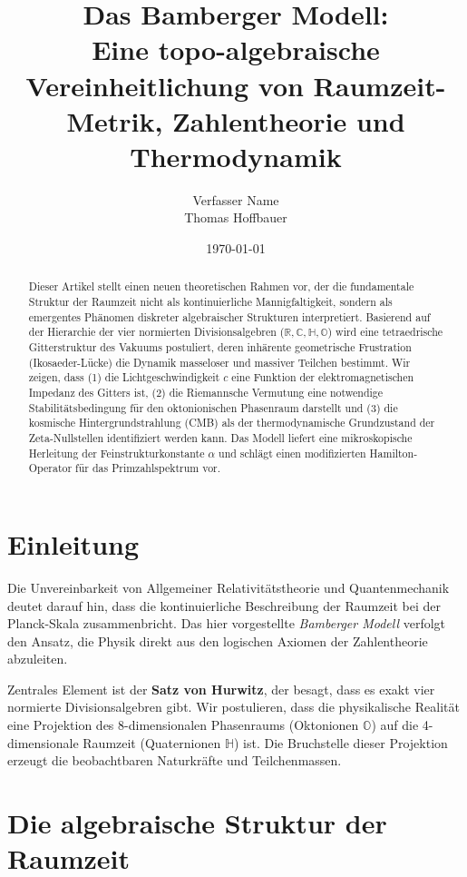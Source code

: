 \documentclass[11pt, a4paper]{article}
\title{\textbf{Das Bamberger Modell:}\\ \large Eine topo-algebraische Vereinheitlichung von Raumzeit-Metrik, Zahlentheorie und Thermodynamik}
\author{Verfasser Name \\ \small{Thomas Hoffbauer}}
\date{\today}
\begin{document}
	
	\maketitle
	
	\begin{abstract}
		\noindent
		Dieser Artikel stellt einen neuen theoretischen Rahmen vor, der die fundamentale Struktur der Raumzeit nicht als kontinuierliche Mannigfaltigkeit, sondern als emergentes Phänomen diskreter algebraischer Strukturen interpretiert. Basierend auf der Hierarchie der vier normierten Divisionsalgebren ($\mathbb{R}, \mathbb{C}, \mathbb{H}, \mathbb{O}$) wird eine tetraedrische Gitterstruktur des Vakuums postuliert, deren inhärente geometrische Frustration (Ikosaeder-Lücke) die Dynamik masseloser und massiver Teilchen bestimmt. Wir zeigen, dass (1) die Lichtgeschwindigkeit $c$ eine Funktion der elektromagnetischen Impedanz des Gitters ist, (2) die Riemannsche Vermutung eine notwendige Stabilitätsbedingung für den oktonionischen Phasenraum darstellt und (3) die kosmische Hintergrundstrahlung (CMB) als der thermodynamische Grundzustand der Zeta-Nullstellen identifiziert werden kann. Das Modell liefert eine mikroskopische Herleitung der Feinstrukturkonstante $\alpha$ und schlägt einen modifizierten Hamilton-Operator für das Primzahlspektrum vor.
	\end{abstract}
	
	\section{Einleitung}
	Die Unvereinbarkeit von Allgemeiner Relativitätstheorie und Quantenmechanik deutet darauf hin, dass die kontinuierliche Beschreibung der Raumzeit bei der Planck-Skala zusammenbricht. Das hier vorgestellte \textit{Bamberger Modell} verfolgt den Ansatz, die Physik direkt aus den logischen Axiomen der Zahlentheorie abzuleiten.
	
	Zentrales Element ist der \textbf{Satz von Hurwitz}, der besagt, dass es exakt vier normierte Divisionsalgebren gibt. Wir postulieren, dass die physikalische Realität eine Projektion des 8-dimensionalen Phasenraums (Oktonionen $\mathbb{O}$) auf die 4-dimensionale Raumzeit (Quaternionen $\mathbb{H}$) ist. Die Bruchstelle dieser Projektion erzeugt die beobachtbaren Naturkräfte und Teilchenmassen.
	
	\section{Die algebraische Struktur der Raumzeit}
	
\end{document}
